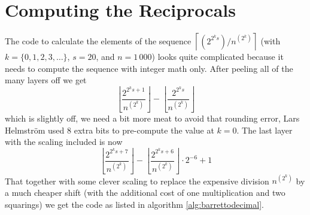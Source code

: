 \documentclass[a4paper,10pt]{article}
\providecommand{\floor}[1]{\left\lfloor#1\right\rfloor}
\providecommand{\ceil}[1]{\left\lceil#1\right\rceil}
\theoremstyle{plain} %
\theoremstyle{definition}
\theoremstyle{remark}
\begin{document}
\section{Computing the Reciprocals}

The code to calculate the elements of the sequence $\ceil{\left(2^{2^ks}\right)/n^{\left(2^k\right)}}$ (with $k = \{0,1,2,3,\dots\}$, $s = 20$, and $n = 1\,000$) looks quite complicated because it needs to compute the sequence with integer math only. After peeling all of the many layers off we get
\begin{equation}
\floor{\frac{2^{2^ks + 1}}{n^{\left(2^k\right)}}} - \floor{\frac{2^{2^ks}}{n^{\left(2^k\right)}}}
\end{equation}
which is slightly off, we need a bit more meat to avoid that rounding error, Lars Helmstr\"om used 8 extra bits to pre-compute the value at $k=0$. The last layer with the scaling included is now
\begin{equation}
\floor{\frac{2^{2^ks + 7}}{n^{\left(2^k\right)}}} - \floor{\frac{2^{2^ks + 6}}{n^{\left(2^k\right)}}}\cdot 2^{-6} + 1
\end{equation}
That together with some clever scaling to replace the expensive division $n^{\left(2^k\right)}$ by a much cheaper shift (with the additional cost of one multiplication and two squarings) we get the code as listed in algorithm \ref{alg:barrettodecimal}.
\end{document}
